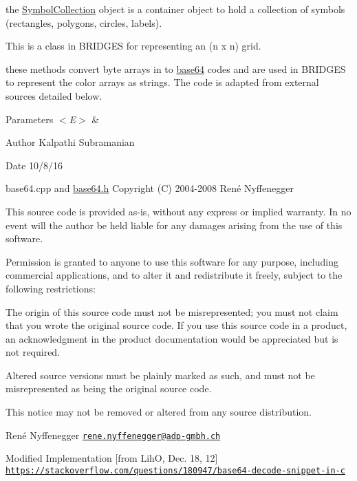the \mbox{\hyperlink{classbridges_1_1_symbol_collection}{Symbol\+Collection}} object is a container object to hold a collection of symbols (rectangles, polygons, circles, labels).

This is a class in B\+R\+I\+D\+G\+ES for representing an (n x n) grid.

these methods convert byte arrays in to \mbox{\hyperlink{namespacebridges_1_1base64}{base64}} codes and are used in B\+R\+I\+D\+G\+ES to represent the color arrays as strings. The code is adapted from external sources detailed below.


\begin{DoxyParams}{Parameters}
{\em $<$\+E$>$} & \\
\hline
\end{DoxyParams}
\begin{DoxyAuthor}{Author}
Kalpathi Subramanian 
\end{DoxyAuthor}
\begin{DoxyDate}{Date}
10/8/16
\end{DoxyDate}
base64.\+cpp and \mbox{\hyperlink{base64_8h}{base64.\+h}} Copyright (C) 2004-\/2008 René Nyffenegger

This source code is provided \textquotesingle{}as-\/is\textquotesingle{}, without any express or implied warranty. In no event will the author be held liable for any damages arising from the use of this software.

Permission is granted to anyone to use this software for any purpose, including commercial applications, and to alter it and redistribute it freely, subject to the following restrictions\+:


\begin{DoxyEnumerate}
\item The origin of this source code must not be misrepresented; you must not claim that you wrote the original source code. If you use this source code in a product, an acknowledgment in the product documentation would be appreciated but is not required.
\begin{DoxyEnumerate}
\item Altered source versions must be plainly marked as such, and must not be misrepresented as being the original source code.
\item This notice may not be removed or altered from any source distribution.
\end{DoxyEnumerate}

René Nyffenegger \href{mailto:rene.nyffenegger@adp-gmbh.ch}{\tt rene.\+nyffenegger@adp-\/gmbh.\+ch}

Modified Implementation \mbox{[}from LihO, Dec. 18, 12\mbox{]} \href{https://stackoverflow.com/questions/180947/base64-decode-snippet-in-c}{\tt https\+://stackoverflow.\+com/questions/180947/base64-\/decode-\/snippet-\/in-\/c}
\end{DoxyEnumerate}

